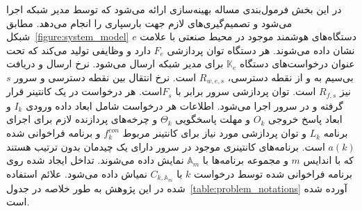 در این بخش فرمول‌بندی مساله بهینه‌سازی ارائه می‌شود که توسط مدیر شبکه اجرا می‌شود و تصمیم‌گیری‌های لازم جهت بارسپاری را انجام می‌دهد. مطابق شبکل~\ref{figure:system_model} دستگاه‌های هوشمند موجود در محیط صنعتی با علامت $e$ نشان داده می‌شوند. هر دستگاه توان پردازشی $F_e$ دارد و وظایفی تولید می‌کند که تحت عنوان درخواست‌های دستگاه $\mathbb{K}_e$ برای مدیر شبکه ارسال می‌شود. نرخ ارسال و دریافت بی‌سیم به و از نقطه دسترسی، $R_{w,e,s}$ است. نرخ انتقال بین نقطه دسترسی و سرور $s$ نیز $R_{f,s}$ است. توان پردازشی سرور برابر با $F_s$است. هر درخواست در یک کانتینر قرار گرفته و در سرور اجرا می‌شود. اطلاعات هر درخواست شامل ابعاد داده ورودی $I_k$ و ابعاد پاسخ خروجی $O_k$ و مهلت پاسخگویی $\Theta_k$ و چرخه‌های پردازنده لازم برای اجرای برنامه $L_k$ و توان پردازشی مورد نیاز برای کانتینر مربوط $f^{con}_k$  و برنامه فراخوانی شده $a(k)$ است. برنامه‌های کانتینری موجود در سرور دارای یک چیدمان بدون ترتیب هستند که با اندایس $m$ و مجموعه برنامه‌ها با $\mathbb{A}_m$ نمایش داده می‌شوند. تداخل ایجاد شده روی برنامه فراخوانی شده توسط درخواست $k$ با $C_{k,\mathbb{A}_m}$ نمیاش داده می‌شود. علائم استفاده شده در این پژوهش به طور خلاصه در جدول~\ref{table:problem_notations} آورده شده است.

